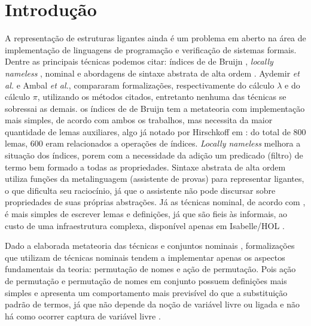 \chapter{Introdução}\label{chp:intro}

A representação de estruturas ligantes ainda é um problema em aberto na área de implementação de linguagens de programação e verificação de sistemas formais. Dentre as principais técnicas podemos citar: índices de de Bruijn \cite{Bruijn1972}, \textit{locally nameless} \cite{Chargueraud2011}, nominal \cite{Gabbay2002} e abordagens de sintaxe abstrata de alta ordem \cite{Pfenning1988,Harper1993}. Aydemir \textit{et al.} \cite{Aydemir2008} e Ambal \cite{Ambal2020} \textit{et al.}, compararam formalizações, respectivamente do cálculo $\lambda$ e do cálculo $\pi$, utilizando os métodos citados, entretanto nenhuma das técnicas se sobressai as demais. os índices de de Bruijn tem a metateoria com implementação mais simples, de acordo com ambos os trabalhos, mas necessita da maior quantidade de lemas auxiliares, algo já notado por Hirschkoff em \cite{Hirschkoff1997}: do total de 800 lemas, 600 eram relacionados a operações de índices. \textit{Locally nameless} melhora a situação dos índices, porem com a necessidade da adição um predicado (filtro) de termo bem formado a todas as propriedades. Sintaxe abstrata de alta ordem utiliza funções da metalinguagem (assistente de provas) para representar ligantes, o que dificulta seu raciocínio, já que o assistente não pode discursar sobre propriedades de suas próprias abstrações. Já as técnicas nominal, de acordo com \cite{Ambal2020}, é mais simples de escrever lemas e definições, já que são fieis às informais, ao custo de uma infraestrutura complexa, disponível apenas em Isabelle/HOL \cite{Aydemir2008}. 


Dado a elaborada metateoria das técnicas e conjuntos nominais \cite{Pitts2006,Pitts2013}, formalizações que utilizam de técnicas nominais \cite{Aydemir2007, Urban2008, Copello2016, Copello2018, Ambal2020} tendem a implementar apenas os aspectos fundamentais da teoria: permutação de nomes e ação de permutação. Pois ação de permutação e permutação de nomes em conjunto possuem definições mais simples e apresenta um comportamento mais previsível do que a substituição padrão de termos, já que não depende da noção de variável livre ou ligada e não há como ocorrer captura de variável livre \cite{Choudhury2015}.

